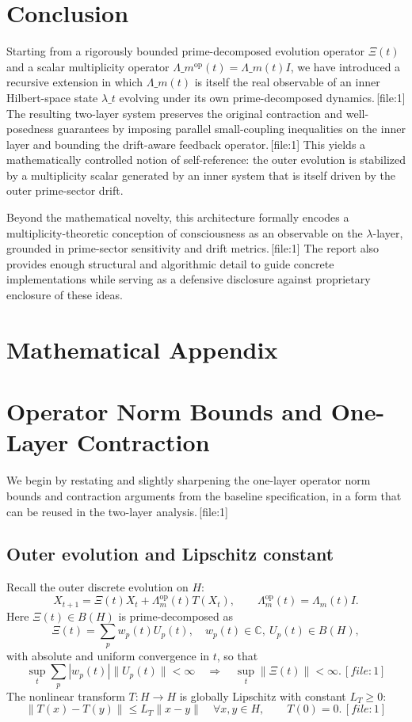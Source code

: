 \documentclass[11pt]{article}
\begin{document}
\section{Conclusion}

Starting from a rigorously bounded prime-decomposed evolution operator $\Xi(t)$ and a scalar multiplicity operator $\Lambda\_m^{\mathrm{op}}(t)=\Lambda\_m(t)I$, we have introduced a recursive extension in which $\Lambda\_m(t)$ is itself the real observable of an inner Hilbert-space state $\lambda\_t$ evolving under its own prime-decomposed dynamics.\,[file:1] The resulting two-layer system preserves the original contraction and well-posedness guarantees by imposing parallel small-coupling inequalities on the inner layer and bounding the drift-aware feedback operator.\,[file:1] This yields a mathematically controlled notion of self-reference: the outer evolution is stabilized by a multiplicity scalar generated by an inner system that is itself driven by the outer prime-sector drift.

Beyond the mathematical novelty, this architecture formally encodes a multiplicity-theoretic conception of consciousness as an observable on the $\lambda$-layer, grounded in prime-sector sensitivity and drift metrics.\,[file:1] The report also provides enough structural and algorithmic detail to guide concrete implementations while serving as a defensive disclosure against proprietary enclosure of these ideas.

\appendix
\section*{Mathematical Appendix}

\section{Operator Norm Bounds and One-Layer Contraction}

We begin by restating and slightly sharpening the one-layer operator norm bounds and contraction arguments from the baseline specification, in a form that can be reused in the two-layer analysis.\,[file:1]

\subsection{Outer evolution and Lipschitz constant}

Recall the outer discrete evolution on $H$:
\begin{equation}
X_{t+1} = \Xi(t) X_t + \Lambda_m^{\mathrm{op}}(t) T(X_t),
\qquad
\Lambda_m^{\mathrm{op}}(t) = \Lambda_m(t) I.
\label{eq:A-outer-evolution}
\end{equation}
Here $\Xi(t)\in B(H)$ is prime-decomposed as
\[
\Xi(t) = \sum_p w_p(t) U_p(t), \quad w_p(t)\in\mathbb{C},\ U_p(t)\in B(H),
\]
with absolute and uniform convergence in $t$, so that
\[
\sup_t \sum_p |w_p(t)|\|U_p(t)\| < \infty \quad\Rightarrow\quad \sup_t \|\Xi(t)\|<\infty.\,[file:1]
\]
The nonlinear transform $T:H\to H$ is globally Lipschitz with constant $L_T\ge 0$:
\[
\|T(x)-T(y)\|\le L_T \|x-y\|\quad\forall x,y\in H,
\qquad T(0)=0.\,[file:1]
\]
\end{document}
